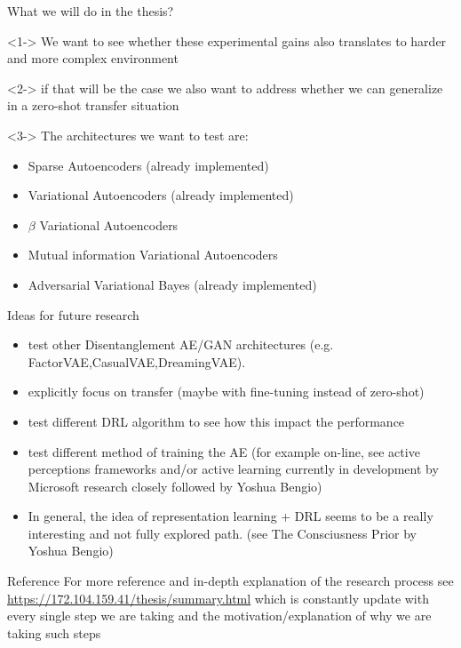 \documentclass[presentation]{beamer}
\begin{document}
\begin{frame}[label={sec:org7be4c23}]{What we will do in the thesis?}
\begin{block}<1->{}
We want to see whether these experimental gains also translates to
harder and more complex environment
\end{block}
\begin{block}<2->{}
if that will be the case we also want to address whether we can
generalize in a zero-shot transfer situation
\end{block}
\begin{block}<3->{}
The architectures we want to test are:
\begin{itemize}
\item Sparse Autoencoders (already implemented)
\item Variational Autoencoders (already implemented)
\item \(\beta\) Variational Autoencoders
\item Mutual information Variational Autoencoders
\item Adversarial Variational Bayes (already implemented)
\end{itemize}
\end{block}
\end{frame}
\begin{frame}[label={sec:org0444cdf}]{Ideas for future research}
\begin{block}{}
\begin{itemize}
\item test other Disentanglement AE/GAN architectures (e.g. FactorVAE,CasualVAE,DreamingVAE).
\item explicitly focus on transfer (maybe with fine-tuning instead of
zero-shot)
\item test different DRL algorithm to see how this impact the performance
\item test different method of training the AE (for example on-line, see
active perceptions frameworks and/or active learning currently in
development by Microsoft research closely followed by  Yoshua
Bengio)
\item In general, the idea of representation learning + DRL seems to be
a really interesting and not fully explored path. (see The Consciusness
Prior by Yoshua Bengio)
\end{itemize}
\end{block}
\end{frame}

\begin{frame}[label={sec:org2844dc9}]{Reference}
For more reference and in-depth explanation of the research process
see \url{https://172.104.159.41/thesis/summary.html} which is constantly
update with every single step we are taking and the
motivation/explanation of why we are taking such steps
\end{frame}
\end{document}
